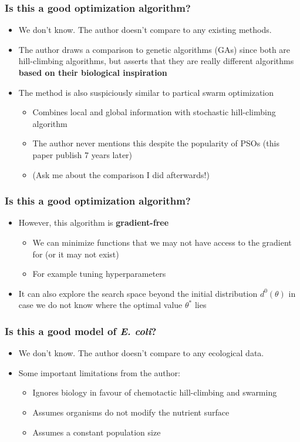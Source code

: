 \documentclass{beamer}
\begin{document}
\begin{frame}
\frametitle{Is this a good optimization algorithm?}
\begin{itemize}
  \item<2-> We don't know. The author doesn't compare to any existing methods.
  \item<3-> The author draws a comparison to genetic algorithms (GAs) since both are hill-climbing algorithms, but asserts that they are really different algorithms \textbf{based on their biological inspiration}
  \item<4-> The method is also suspiciously similar to partical swarm optimization
  \begin{itemize}
    \item<5-> Combines local and global information with stochastic hill-climbing algorithm
    \item<5-> The author never mentions this despite the popularity of PSOs (this paper publish 7 years later)
    \item<6-> (Ask me about the comparison I did afterwards!)
  \end{itemize}
\end{itemize}
\end{frame}

\begin{frame}
\frametitle{Is this a good optimization algorithm?}
\begin{itemize}
  \item<1-> However, this algorithm is \textbf{gradient-free}
  \begin{itemize}
    \item<2-> We can minimize functions that we may not have access to the gradient for (or it may not exist)
    \item<2-> For example tuning hyperparameters
  \end{itemize}
  \item<3-> It can also explore the search space beyond the initial distribution $d^0(\theta)$ in case we do not know where the optimal value $\theta^*$ lies
\end{itemize}
\end{frame}

\begin{frame}
\frametitle{Is this a good model of \textit{E. coli}?}
\begin{itemize}
  \item<2-> We don't know. The author doesn't compare to any ecological data.
  \item<3-> Some important limitations from the author:
  \begin{itemize}
    \item<4-> Ignores biology in favour of chemotactic hill-climbing and swarming
    \item<5-> Assumes organisms do not modify the nutrient surface
    \item<6-> Assumes a constant population size
  \end{itemize}
\end{itemize}
\end{frame}
\end{document}
